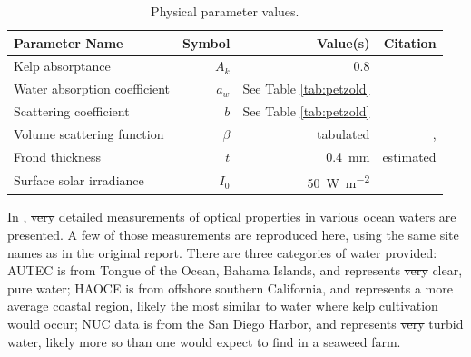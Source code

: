 \documentclass[ms,cpyr,lof,lot]{uathesis}
\providecommand{\DIFadd}[1]{{\protect\color{blue}\uwave{#1}}} %
\providecommand{\DIFdel}[1]{{\protect\color{red}\sout{#1}}}                      %
\providecommand{\DIFdelbegin}{} %
\providecommand{\DIFdelend}{} %
\providecommand{\DIFaddFL}[1]{\DIFadd{#1}} %
\providecommand{\DIFdelFL}[1]{\DIFdel{#1}} %
\providecommand{\DIFaddbeginFL}{} %
\providecommand{\DIFaddendFL}{} %
\providecommand{\DIFdelbeginFL}{} %
\providecommand{\DIFdelendFL}{} %
\newcommand{\DIFscaledelfig}{0.5}
\newlength{\DIFdelgraphicswidth} %
\newlength{\DIFdelgraphicsheight} %
\newcommand{\DIFaddincludegraphics}[2][]{{\color{blue}\fbox{\DIFOincludegraphics[#1]{#2}}}} %
\newcommand{\DIFdelincludegraphics}[2][]{%
\sbox{\DIFdelgraphicsbox}{\DIFOincludegraphics[#1]{#2}}%
\settoboxwidth{\DIFdelgraphicswidth}{\DIFdelgraphicsbox} %
\settoboxtotalheight{\DIFdelgraphicsheight}{\DIFdelgraphicsbox} %
\scalebox{\DIFscaledelfig}{%
\parbox[b]{\DIFdelgraphicswidth}{\usebox{\DIFdelgraphicsbox}\\[-\baselineskip] \rule{\DIFdelgraphicswidth}{0em}}\llap{\resizebox{\DIFdelgraphicswidth}{\DIFdelgraphicsheight}{%
\setlength{\unitlength}{\DIFdelgraphicswidth}%
\begin{picture}(1,1)%
\thicklines\linethickness{2pt} %
{\color[rgb]{1,0,0}\put(0,0){\framebox(1,1){}}}%
{\color[rgb]{1,0,0}\put(0,0){\line( 1,1){1}}}%
{\color[rgb]{1,0,0}\put(0,1){\line(1,-1){1}}}%
\end{picture}%
}\hspace*{3pt}}} %
} %
\DeclareRobustCommand{\DIFdelbegin}{\DIFOdelbegin \let\includegraphics\DIFdelincludegraphics} %
\DeclareRobustCommand{\DIFdelend}{\DIFOaddend \let\includegraphics\DIFOincludegraphics} %
\DeclareRobustCommand{\DIFaddbeginFL}{\DIFOaddbeginFL \let\includegraphics\DIFaddincludegraphics} %
\DeclareRobustCommand{\DIFaddendFL}{\DIFOaddendFL \let\includegraphics\DIFOincludegraphics} %
\DeclareRobustCommand{\DIFdelbeginFL}{\DIFOdelbeginFL \let\includegraphics\DIFdelincludegraphics} %
\DeclareRobustCommand{\DIFdelendFL}{\DIFOaddendFL \let\includegraphics\DIFOincludegraphics} %
\begin{document}
\begin{table}[h]
  \centering
  \caption{Physical parameter values.}
  \begin{tabular}{lrrr}
    \toprule
    Parameter Name & Symbol & Value(s) & Citation \\ %
    \midrule
    Kelp absorptance & $A_k$ & 0.8 & \cite{colombo-pallotta_photosynthetic_2006} \\%
    Water absorption coefficient & $a_w$ & See Table \ref{tab:petzold} & \cite{petzold_volume_1972} \\%
    Scattering coefficient & $b$  & See Table \ref{tab:petzold} & \cite{petzold_volume_1972} \\%
    Volume scattering function & $\beta$ & tabulated & \cite{petzold_volume_1972,sokolov_parameterization_2010} \DIFdelbeginFL \DIFdelFL{, }\DIFdelendFL \\%
    Frond thickness & \DIFdelbeginFL \DIFdelFL{$t$ }\DIFdelendFL \DIFaddbeginFL \DIFaddFL{$f_t$ }\DIFaddendFL & \SI{0.4}{\mm} & estimated \\
    Surface solar irradiance & $I_0$ & \SI{50}{\W\per\m\squared} & \cite{broch_modelling_2012}  \\%
    \bottomrule
  \end{tabular}
  \label{tab:params}
\end{table}

In \citep{petzold_volume_1972}, \DIFdelbegin \DIFdel{very }\DIFdelend detailed measurements of optical properties in various ocean waters are presented.
A few of those measurements are reproduced here, using the same site names as in the original report.
There are three categories of water provided: AUTEC is from Tongue of the Ocean, Bahama Islands,
and represents \DIFdelbegin \DIFdel{very }\DIFdelend clear, pure water; HAOCE is from offshore southern California, and represents a more average coastal region,
likely the most similar to water where kelp cultivation would occur; NUC data is from the San Diego Harbor, and represents \DIFdelbegin \DIFdel{very }\DIFdelend turbid water,
likely more so than one would expect to find in a seaweed farm.
\end{document}
